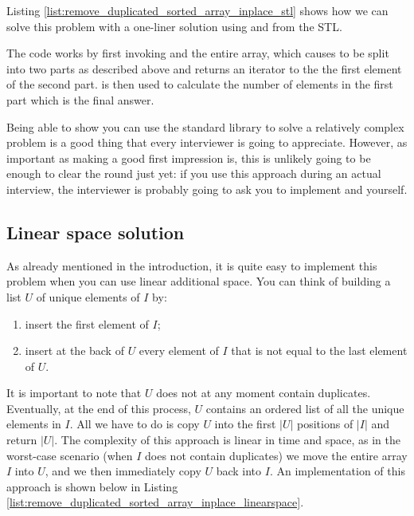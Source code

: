 Listing \ref{list:remove_duplicated_sorted_array_inplace_stl} shows how we can
solve this problem with a one-liner solution using  and  from the STL. 




The code works by first invoking  and the entire array, which causes  to be split into two parts as described above and returns an iterator to the the first element of the second part. 
 is then used to calculate the number of elements in the first part which is the final answer.

Being able to show you can use the standard library to solve a relatively complex problem is a good thing that every interviewer is going to appreciate. 
However, as important as making a good first impression is, this is unlikely going to be enough to clear the round just yet: if you use this approach
during an actual interview, the interviewer is probably going to ask you to implement  and  yourself.



\subsection{Linear space solution}

As already mentioned in the introduction, it is quite easy to implement this problem when you can use
linear additional space. You can think of building a list $U$ of unique elements of $I$ by:

\begin{enumerate}
	\item insert the first element of $I$;
	\item insert at the back of $U$ every element of $I$ that is not equal to the last element of $U$.
\end{enumerate}

It is important to note that $U$ does not at any moment contain duplicates. Eventually, at the end of this process, $U$ contains an ordered list of all the unique elements in $I$. All we
have to do is copy $U$ into the first $|U|$ positions of $|I|$ and return $|U|$. The complexity
of this approach is linear in time and space, as in the worst-case scenario (when $I$ does not contain duplicates) we move the entire array $I$ into $U$, and we then immediately copy $U$ back into $I$. An implementation of this approach is shown below in Listing
\ref{list:remove_duplicated_sorted_array_inplace_linearspace}.



